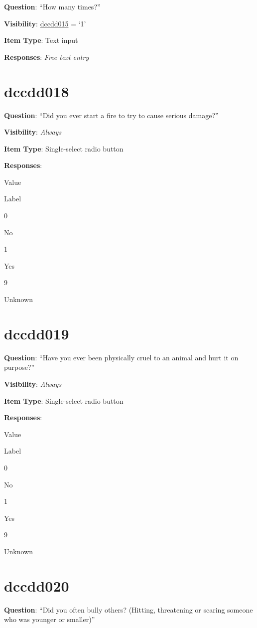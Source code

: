 \documentclass[]{book}
\begin{document}
\textbf{Question}: ``How many times?''

\textbf{Visibility}: \protect\hyperlink{dccdd015}{dccdd015} = `1'

\textbf{Item Type}: Text input

\textbf{Responses}: \emph{Free text entry}

\hypertarget{dccdd018}{%
\section{dccdd018}\label{dccdd018}}

\textbf{Question}: ``Did you ever start a fire to try to cause serious damage?''

\textbf{Visibility}: \emph{Always}

\textbf{Item Type}: Single-select radio button

\textbf{Responses}:

Value

Label

0

No

1

Yes

9

Unknown

\hypertarget{dccdd019}{%
\section{dccdd019}\label{dccdd019}}

\textbf{Question}: ``Have you ever been physically cruel to an animal and hurt it on purpose?''

\textbf{Visibility}: \emph{Always}

\textbf{Item Type}: Single-select radio button

\textbf{Responses}:

Value

Label

0

No

1

Yes

9

Unknown

\hypertarget{dccdd020}{%
\section{dccdd020}\label{dccdd020}}

\textbf{Question}: ``Did you often bully others? (Hitting, threatening or scaring someone who was younger or smaller)''
\end{document}

